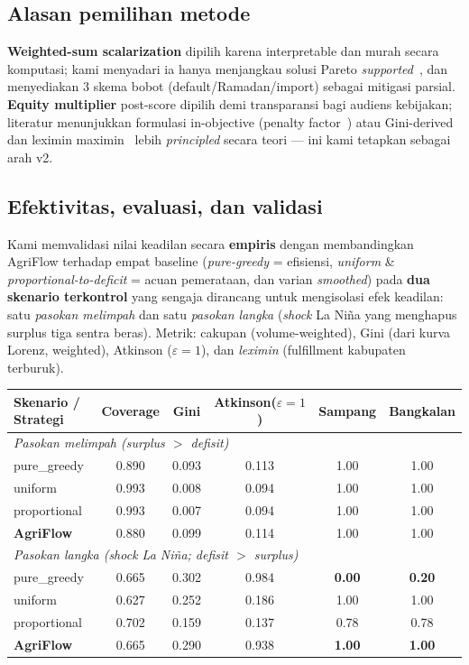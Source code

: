 \documentclass[11pt,a4paper]{article}
\begin{document}
\subsection{Alasan pemilihan metode}
\textbf{Weighted-sum scalarization} dipilih karena interpretable dan murah secara komputasi; kami
menyadari ia hanya menjangkau solusi Pareto \emph{supported}~\cite{bazgan2021}, dan menyediakan
3 skema bobot (default/Ramadan/import) sebagai mitigasi parsial. \textbf{Equity multiplier}
post-score dipilih demi transparansi bagi audiens kebijakan; literatur menunjukkan formulasi
in-objective (penalty factor~\cite{firouz2021}) atau Gini-derived~\cite{alem2021} dan leximin
maximin~\cite{hakimifar2022} lebih \emph{principled} secara teori --- ini kami tetapkan sebagai
arah v2.

\subsection{Efektivitas, evaluasi, dan validasi}
Kami memvalidasi nilai keadilan secara \textbf{empiris} dengan membandingkan AgriFlow terhadap
empat baseline (\emph{pure-greedy} = efisiensi, \emph{uniform} \& \emph{proportional-to-deficit}
= acuan pemerataan, dan varian \emph{smoothed}) pada \textbf{dua skenario terkontrol} yang sengaja
dirancang untuk mengisolasi efek keadilan: satu \emph{pasokan melimpah} dan satu \emph{pasokan
langka} (\emph{shock} La Ni\~na yang menghapus surplus tiga sentra beras). Metrik: cakupan
(volume-weighted), Gini (dari kurva Lorenz, weighted), Atkinson ($\varepsilon{=}1$), dan
\emph{leximin} (fulfillment kabupaten terburuk).

\begin{center}
\begin{tabular}{lccccc}
\toprule
\textbf{Skenario / Strategi} & Coverage & Gini & Atkinson($\varepsilon{=}1$) & Sampang & Bangkalan \\
\midrule
\multicolumn{6}{l}{\emph{Pasokan melimpah (surplus $>$ defisit)}}\\
\quad pure\_greedy      & 0.890 & 0.093 & 0.113 & 1.00 & 1.00 \\
\quad uniform           & 0.993 & 0.008 & 0.094 & 1.00 & 1.00 \\
\quad proportional      & 0.993 & 0.007 & 0.094 & 1.00 & 1.00 \\
\quad \textbf{AgriFlow}  & 0.880 & 0.099 & 0.114 & 1.00 & 1.00 \\
\midrule
\multicolumn{6}{l}{\emph{Pasokan langka (shock La Ni\~na; defisit $>$ surplus)}}\\
\quad pure\_greedy      & 0.665 & 0.302 & 0.984 & \textbf{0.00} & \textbf{0.20} \\
\quad uniform           & 0.627 & 0.252 & 0.186 & 1.00 & 1.00 \\
\quad proportional      & 0.702 & 0.159 & 0.137 & 0.78 & 0.78 \\
\quad \textbf{AgriFlow}  & 0.665 & 0.290 & 0.938 & \textbf{1.00} & \textbf{1.00} \\
\bottomrule
\end{tabular}
\end{center}
\end{document}
